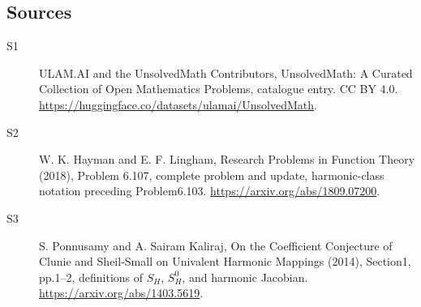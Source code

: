 \documentclass[11pt]{article}
\begin{document}
\subsection{Sources}
\begin{description}
\item[\hypertarget{source:statement:1}{S1}] ULAM.AI and the UnsolvedMath Contributors, UnsolvedMath: A Curated Collection of Open Mathematics Problems, catalogue entry. CC BY 4.0. \url{https://huggingface.co/datasets/ulamai/UnsolvedMath}.
\item[\hypertarget{source:statement:2}{S2}] W. K. Hayman and E. F. Lingham, Research Problems in Function Theory (2018), Problem 6.107, complete problem and update, harmonic-class notation preceding Problem6.103. \url{https://arxiv.org/abs/1809.07200}.
\item[\hypertarget{source:statement:3}{S3}] S. Ponnusamy and A. Sairam Kaliraj, On the Coefficient Conjecture of Clunie and Sheil-Small on Univalent Harmonic Mappings (2014), Section1, pp.1--2, definitions of $S_H$, $S_H^0$, and harmonic Jacobian. \url{https://arxiv.org/abs/1403.5619}.
\end{description}
\label{end:statement}
\end{document}

